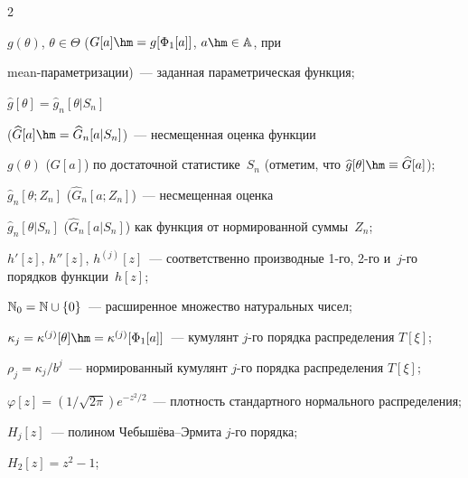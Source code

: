 \begin{multicols}{2}
\begin{description}
 $g(\theta)$, $\theta\in \Theta$ ($G[a]\hm=g[\Phi_1[a]]$, $a\hm\in \mathbb {A}$, при 


 mean-па\-ра\-мет\-ри\-за\-ции)~--- заданная параметрическая функция;


\item[\,]


 $\widehat{g}[\theta]=\widehat{g}_n[\theta|S_n]$


 ($\widehat{G}[a]\hm=\widehat{G}_n[a|S_n]$)~--- несмещенная оценка функции


 $g(\theta)$ ($G[a]$) по достаточной статистике~$S_n$ (отметим, что $\widehat{g}[\theta]\hm\equiv \widehat{G}[a]$);


\item[\,]


 $\widehat{g}_n[\theta;Z_n]$ ($\widehat{G}_n[a;Z_n]$)~--- несмещенная оценка


 $\widehat{g}_n[\theta|S_n]$ ($\widehat{G}_n[a|S_n]$) как функция от нормированной суммы~$Z_n$;


\item[\,]


 $h'[z]$,  $h''[z]$, $h^{(j)}[z]$~--- соответственно производные 1-го, 2-го и~$j$-го порядков функции~$h[z]$;


\item[\,]


 $\mathbb{N}_0=\mathbb{N} \cup \{0\}$~--- расширенное множество натуральных чисел;


\item[\,]


 $\kappa_j =\kappa^{(j)} [\theta]\hm=\kappa^{(j)} [\Phi_1[a]]$~--- кумулянт $j$-го порядка распределения $T[\xi]$;


\item[\,]


 $\rho_j =\kappa_j/b^j$~--- нормированный кумулянт $j$-го порядка распределения $T[\xi]$;


\item[\,]


 $\varphi[z]=({1}/{\sqrt{2\pi}}) e^{-z^2/2}$~--- плотность стандартного нормального распределения;


\item[\,]


 $H_j[z]$~--- полином Че\-бы\-шё\-ва--Эр\-ми\-та $j$-го по\-рядка;


\item[\,]


 $H_2[z]=z^2-1$; 


 \item[\,]



\end{description}
\end{multicols}
